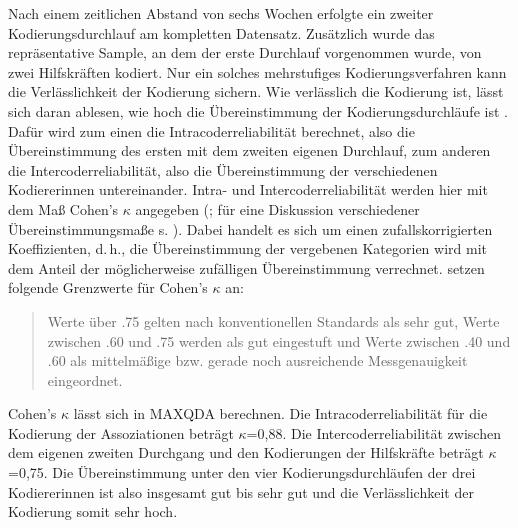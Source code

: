 Nach einem zeitlichen Abstand von sechs Wochen erfolgte ein zweiter Kodierungsdurchlauf am kompletten Datensatz. 
Zusätzlich wurde das repräsentative Sample, an dem der erste Durchlauf vorgenommen wurde, von zwei Hilfskräften kodiert. 
Nur ein solches mehrstufiges Kodierungsverfahren kann die Verlässlichkeit der Kodierung sichern. 
Wie verlässlich die Kodierung ist, lässt sich daran ablesen, wie hoch die Übereinstimmung der Kodierungsdurchläufe ist \citep[s.][557]{Artstein.2008}. 
Dafür wird zum einen die Intracoderreliabilität berechnet, also die Übereinstimmung des ersten mit dem zweiten eigenen Durchlauf, zum anderen die Intercoderreliabilität, also die Übereinstimmung der verschiedenen Kodiererinnen untereinander. 
Intra- und Intercoderreliabilität werden hier mit dem Maß Cohen's $\kappa$ angegeben (\citealp[s.][]{Cohen.1960}; für eine Diskussion verschiedener Übereinstimmungsmaße s. \citealp{Artstein.2008}).
Dabei handelt es sich um einen zufallskorrigierten Koeffizienten, d.\,h., die Übereinstimmung der vergebenen Kategorien wird mit dem Anteil der möglicherweise zufälligen Übereinstimmung verrechnet. 
\citet{Doring2016} setzen folgende Grenzwerte für Cohen's $\kappa$ an: \begin{quote} Werte über .75 gelten nach konventionellen Standards als sehr gut, Werte zwischen .60 und .75 werden als gut eingestuft und Werte zwischen .40 und .60 als mittelmäßige bzw. gerade noch ausreichende Messgenauigkeit eingeordnet. \citep[346]{Doring2016} \end{quote}
Cohen's $\kappa$ lässt sich in MAXQDA berechnen. 
Die Intracoderreliabilität für die Kodierung der Assoziationen beträgt $\kappa$=0,88.
Die Intercoderreliabilität zwischen dem eigenen zweiten Durchgang und den Kodierungen der Hilfskräfte beträgt $\kappa$=0,75.
Die Übereinstimmung unter den vier Kodierungsdurchläufen der drei Kodiererinnen ist also insgesamt gut bis sehr gut und die Verlässlichkeit der Kodierung somit sehr hoch. 

